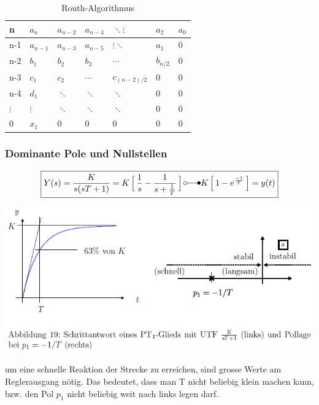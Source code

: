\begin{table}
	\begin{tabularx}{0.6\textwidth}{|X||X|X|X|X|X|X|}
	\hline
		n & \cellcolor{hellgrau}$a_n$ & $a_{n-2}$ & $a_{n-4}$ & $\ddots\vdots$ & $a_{2}$  & $a_{0}$ \\ \hline
		n-1 & \cellcolor{hellgrau} $a_{n-1}$ & $a_{n-3}$ & $a_{n-5}$ & $\vdots\ddots$ & $a_{1}$  & 0 \\ \hline\hline
		n-2 & \cellcolor{hellgrau} $b_{1}$ & $b_{2}$ & $b_{3}$ & $\cdots$ & $b_{n/2}$  & 0 \\ \hline
		n-3 & \cellcolor{hellgrau} $c_{1}$ & $c_{2}$ & $\cdots$ & $c_{(n-2)/2}$ & 0 & 0 \\ \hline
		n-4 & \cellcolor{hellgrau} $d_{1}$ & $\ddots$ & $\ddots$ & $\ddots$ & 0 & 0 \\ \hline
		$\vdots$ & \cellcolor{hellgrau} $\vdots$ &  $\ddots$ & $\ddots$ & $\ddots$ & 0 & 0 \\ \hline
		0 & \cellcolor{hellgrau} $x_1$ & 0 & 0 & 0 & 0 & 0 \\ \hline
	\end{tabularx}
\caption{Routh-Algorithmus}
\end{table}

\subsubsection{Dominante Pole und Nullstellen}

\begin{equation}
\boxed{Y(s)=\frac{K}{s(sT+1)}=K\mathop{\Big[}\frac{1}{s}-\frac{1}{s+\frac{1}{T}}\mathop{\Big]} \laplace K\mathop{\Big[}1-e^{\frac{-1}{T}}\mathop{\Big]}=y(t)}
\end{equation}
		\begin{center}
			\includegraphics[width=15cm]{./images/PoleNullstellen.png}
		\end{center}
um eine schnelle Reaktion der Strecke
zu erreichen, sind grosse Werte am Reglerausgang nötig. Das bedeutet, dass man
T nicht beliebig klein machen kann, bzw. den Pol $p_1$ nicht beliebig weit nach links
legen darf.\\

